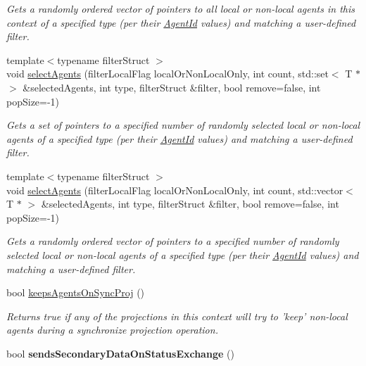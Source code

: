 \begin{DoxyCompactItemize}
\begin{DoxyCompactList}\small\item\em Gets a randomly ordered vector of pointers to all local or non-\/local agents in this context of a specified type (per their \hyperlink{classrepast_1_1_agent_id}{Agent\-Id} values) and matching a user-\/defined filter. \end{DoxyCompactList}\item 
{\footnotesize template$<$typename filter\-Struct $>$ }\\void \hyperlink{classrepast_1_1_shared_context_a3b8319411f215f52f30dd55c46aa9314}{select\-Agents} (filter\-Local\-Flag local\-Or\-Non\-Local\-Only, int count, std\-::set$<$ T $\ast$ $>$ \&selected\-Agents, int type, filter\-Struct \&filter, bool remove=false, int pop\-Size=-\/1)
\begin{DoxyCompactList}\small\item\em Gets a set of pointers to a specified number of randomly selected local or non-\/local agents of a specified type (per their \hyperlink{classrepast_1_1_agent_id}{Agent\-Id} values) and matching a user-\/defined filter. \end{DoxyCompactList}\item 
{\footnotesize template$<$typename filter\-Struct $>$ }\\void \hyperlink{classrepast_1_1_shared_context_ad2dfe0d53036f8b199c9072c8b804629}{select\-Agents} (filter\-Local\-Flag local\-Or\-Non\-Local\-Only, int count, std\-::vector$<$ T $\ast$ $>$ \&selected\-Agents, int type, filter\-Struct \&filter, bool remove=false, int pop\-Size=-\/1)
\begin{DoxyCompactList}\small\item\em Gets a randomly ordered vector of pointers to a specified number of randomly selected local or non-\/local agents of a specified type (per their \hyperlink{classrepast_1_1_agent_id}{Agent\-Id} values) and matching a user-\/defined filter. \end{DoxyCompactList}\item 
bool \hyperlink{classrepast_1_1_shared_context_a4c51b1d4b62bb6844334699c5bfba23e}{keeps\-Agents\-On\-Sync\-Proj} ()
\begin{DoxyCompactList}\small\item\em Returns true if any of the projections in this context will try to 'keep' non-\/local agents during a synchronize projection operation. \end{DoxyCompactList}\item 
\hypertarget{classrepast_1_1_shared_context_acc810aec846be9a7c166aa0d42343028}{bool {\bfseries sends\-Secondary\-Data\-On\-Status\-Exchange} ()}\label{classrepast_1_1_shared_context_acc810aec846be9a7c166aa0d42343028}


\end{DoxyCompactItemize}
